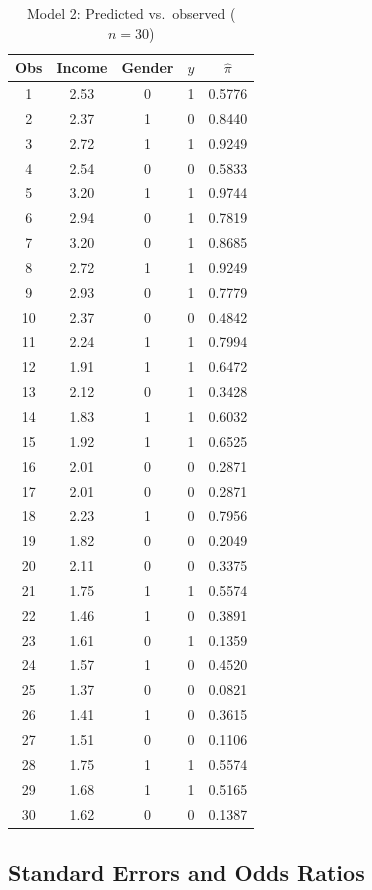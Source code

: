\documentclass[12pt,a4paper]{article}
\begin{document}
\begin{table}[H]
\centering
\caption{Model 2: Predicted vs.\ observed ($n = 30$)}
\footnotesize
\begin{tabular}{ccccc}
\toprule
Obs & Income & Gender & $y$ & $\hat{\pi}$ \\
\midrule
 1 & 2.53 & 0 & 1 & 0.5776 \\
 2 & 2.37 & 1 & 0 & 0.8440 \\
 3 & 2.72 & 1 & 1 & 0.9249 \\
 4 & 2.54 & 0 & 0 & 0.5833 \\
 5 & 3.20 & 1 & 1 & 0.9744 \\
 6 & 2.94 & 0 & 1 & 0.7819 \\
 7 & 3.20 & 0 & 1 & 0.8685 \\
 8 & 2.72 & 1 & 1 & 0.9249 \\
 9 & 2.93 & 0 & 1 & 0.7779 \\
10 & 2.37 & 0 & 0 & 0.4842 \\
11 & 2.24 & 1 & 1 & 0.7994 \\
12 & 1.91 & 1 & 1 & 0.6472 \\
13 & 2.12 & 0 & 1 & 0.3428 \\
14 & 1.83 & 1 & 1 & 0.6032 \\
15 & 1.92 & 1 & 1 & 0.6525 \\
16 & 2.01 & 0 & 0 & 0.2871 \\
17 & 2.01 & 0 & 0 & 0.2871 \\
18 & 2.23 & 1 & 0 & 0.7956 \\
19 & 1.82 & 0 & 0 & 0.2049 \\
20 & 2.11 & 0 & 0 & 0.3375 \\
21 & 1.75 & 1 & 1 & 0.5574 \\
22 & 1.46 & 1 & 0 & 0.3891 \\
23 & 1.61 & 0 & 1 & 0.1359 \\
24 & 1.57 & 1 & 0 & 0.4520 \\
25 & 1.37 & 0 & 0 & 0.0821 \\
26 & 1.41 & 1 & 0 & 0.3615 \\
27 & 1.51 & 0 & 0 & 0.1106 \\
28 & 1.75 & 1 & 1 & 0.5574 \\
29 & 1.68 & 1 & 1 & 0.5165 \\
30 & 1.62 & 0 & 0 & 0.1387 \\
\bottomrule
\end{tabular}
\end{table}

\subsection{Standard Errors and Odds Ratios}
\end{document}
